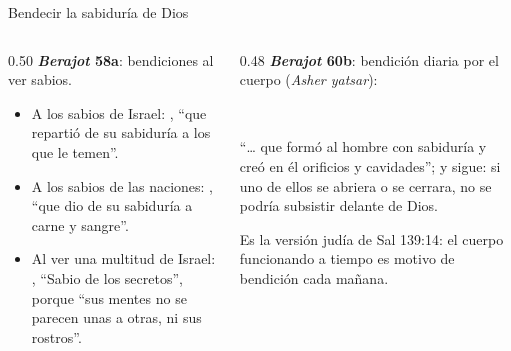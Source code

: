 \begin{frame}{Bendecir la sabiduría de Dios}
\begin{columns}[t,onlytextwidth]
\begin{column}{0.50\textwidth}\small
\RaggedRight\textbf{\emph{Berajot} 58a}: bendiciones al ver sabios.
\begin{itemize}\RaggedRight
\item A los sabios de Israel: , ``que repartió de su sabiduría a los que le temen''.
\item A los sabios de las naciones: , ``que dio de su sabiduría a carne y sangre''.
\item Al ver una multitud de Israel: , ``Sabio de los secretos'', porque ``sus mentes no se parecen unas a otras, ni sus rostros''.
\end{itemize}
\end{column}
\begin{column}{0.48\textwidth}\small
\textbf{\emph{Berajot} 60b}: bendición diaria por el cuerpo (\emph{Asher yatsar}):
\begin{center}\\ \end{center}
``\ldots{} que formó al hombre con sabiduría y creó en él orificios y cavidades''; y sigue: si uno de ellos se abriera o se cerrara, no se podría subsistir delante de Dios.\par\smallskip
\scriptsize Es la versión judía de Sal 139:14: el cuerpo funcionando a tiempo es motivo de bendición cada mañana.
\end{column}
\end{columns}
\end{frame}

